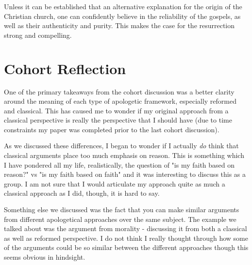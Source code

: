 \documentclass[12pt]{turabian-researchpaper}
\begin{document}
Unless it can be established that an alternative explanation for the origin of the Christian church, one can confidently believe in the reliability of the gospels, as well as their authenticity and purity. This makes the case for the resurrection strong and compelling.



\section{Cohort Reflection}

One of the primary takeaways from the cohort discussion was a better clarity around the meaning of each type of apologetic framework, especially reformed and classical. This has caused me to wonder if my original approach from a classical perspective is really the perspective that I should have (due to time constraints my paper was completed prior to the last cohort discussion).

As we discussed these differences, I began to wonder if I actually \textit{do} think that classical arguments place too much emphasis on reason. This is something which I have pondered all my life, realistically, the question of "is my faith based on reason?" vs "is my faith based on faith" and it was interesting to discuss this as a group. I am not sure that I would articulate my approach quite as much a classical approach as I did, though, it is hard to say. 

Something else we discussed was the fact that you can make similar arguments from different apologetical approaches over the same subject. The example we talked about was the argument from morality - discussing it from both a classical as well as reformed perspective. I do not think I really thought through how some of the arguments could be so similar between the different approaches though this seems obvious in hindsight.
\end{document}
